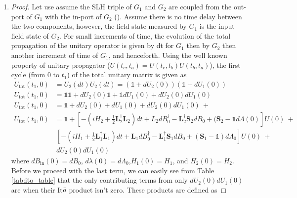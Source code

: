 \documentclass[a4paper]{article}
\theoremstyle{definition}
\newtheorem{definition}{Definition}[section]
\begin{document}
\begin{enumerate}[label=(\roman*)]
\begin{definition}{Series Product.}
\begin{align*}
    G_{\text{series}} = & \ G_2 \triangleleft G_1 \\
    G_{\text{series}} = & \ (\textbf{S}_2,\textbf{L}_2,H_2) \triangleleft (\textbf{S}_1,\textbf{L}_1,H_1)
\end{align*}
\begin{align}
    G_{\text{series}} = & \ \Bigg( \textbf{S}_2\textbf{S}_1,\textbf{L}_2+\textbf{S}_2\textbf{L}_1,H_1 + H_2 + \frac{1}{2i}(\textbf{L}_2^\dagger \textbf{S}_2\textbf{L}_1 - \textbf{L}_1^\dagger \textbf{S}_2^\dagger \textbf{L}_2) \Bigg) 
    \label{eq:series}
\end{align}
\end{definition}
\item
\begin{proof}
Let use assume the SLH triple of $G_1$ and $G_2$ are coupled from the out-port of $G_1$ with the in-port of $G_2$ (\cite{Kockum_2012}). Assume there is no time delay between the two components, however, the field state measured by $G_1$ is the input field state of $G_2$. For small increments of time, the evolution of the total propagation of the unitary operator is given by dt for $G_1$ then by $G_2$ then another increment of time of $G_1$, and henceforth. Using the well known property of unitary propagator ($U(t_c,t_a) = U(t_c,t_b)U(t_b,t_a)$), the first cycle (from 0 to $t_1$) of the total unitary matrix is given as 
\begin{align}
    U_{\text{tot}}(t_1,0) & = U_2(dt)U_2(dt) = (\mathbb{1}+dU_2(0))(\mathbb{1}+dU_1(0)) \nonumber \\
    U_{\text{tot}}(t_1,0) & = \mathbb{1}\mathbb{1} + dU_2(0)\mathbb{1} + \mathbb{1}dU_1(0) + dU_2(0)dU_1(0)  \nonumber \\
    U_{\text{tot}}(t_1,0) & = \mathbb{1} +  dU_2(0) + dU_1(0) + dU_2(0)dU_1(0) \ + \nonumber \\ 
    U_{\text{tot}}(t_1,0) & = \mathbb{1} + [-(iH_{2} +  \frac{1}{2}\textbf{L}_2^\dagger \textbf{L}_2)dt + L_2 dB^\dagger_0 - \textbf{L}_2^\dagger \textbf{S}_2dB_0 + (\textbf{S}_2-\mathbb{1} d\Lambda(0)] U(0) \ + \nonumber \\
     & \ [-(iH_{1} + \frac{1}{2}\textbf{L}_1^\dagger \textbf{L}_1)dt + \textbf{L}_1 dB^\dagger_0 - \textbf{L}_1^\dagger \textbf{S}_1 dB_0 + (\textbf{S}_1-\mathbb{1})d\Lambda_0] U(0) \ + \nonumber \\ 
     & \ dU_2(0)dU_1(0) \label{eq:seriers_proof_1}
\end{align}
where $dB_{\text{in}}(0) = dB_0$, $d\lambda(0) = d\Lambda_0$,$H_1(0) = H_1$, and $H_2(0) = H_2$. Before we proceed with the last term, we can easily see from Table \ref{tab:ito_table} that the only contributing terms from only $dU_2(0)dU_1(0)$ are when their It$\Bar{o}$ product isn't zero. These products are defined as 

\end{proof}
\end{enumerate}
\end{document}
